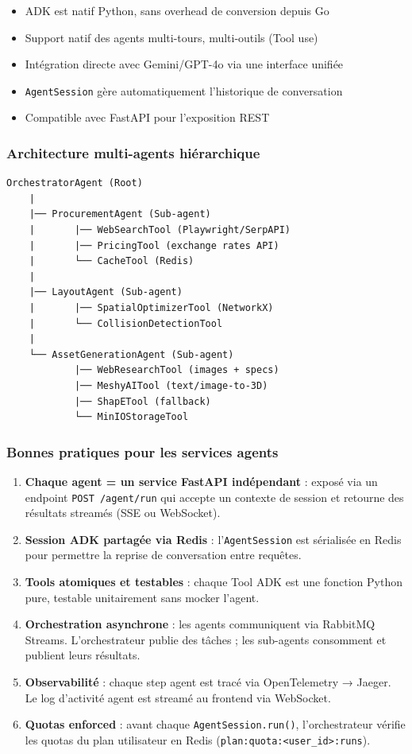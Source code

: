 \documentclass[12pt,a4paper]{article}
\begin{document}
\begin{itemize}
  \item ADK est natif Python, sans overhead de conversion depuis Go
  \item Support natif des agents multi-tours, multi-outils (Tool use)
  \item Intégration directe avec Gemini/GPT-4o via une interface unifiée
  \item \texttt{AgentSession} gère automatiquement l'historique de conversation
  \item Compatible avec FastAPI pour l'exposition REST
\end{itemize}

\subsubsection{Architecture multi-agents hiérarchique}

\begin{lstlisting}[language={}]
OrchestratorAgent (Root)
    |
    |── ProcurementAgent (Sub-agent)
    |       |── WebSearchTool (Playwright/SerpAPI)
    |       |── PricingTool (exchange rates API)
    |       └── CacheTool (Redis)
    |
    |── LayoutAgent (Sub-agent)
    |       |── SpatialOptimizerTool (NetworkX)
    |       └── CollisionDetectionTool
    |
    └── AssetGenerationAgent (Sub-agent)
            |── WebResearchTool (images + specs)
            |── MeshyAITool (text/image-to-3D)
            |── ShapETool (fallback)
            └── MinIOStorageTool
\end{lstlisting}

\subsubsection{Bonnes pratiques pour les services agents}

\begin{enumerate}
  \item \textbf{Chaque agent = un service FastAPI indépendant} : exposé via un endpoint \texttt{POST /agent/run} qui accepte un contexte de session et retourne des résultats streamés (SSE ou WebSocket).
  \item \textbf{Session ADK partagée via Redis} : l'\texttt{AgentSession} est sérialisée en Redis pour permettre la reprise de conversation entre requêtes.
  \item \textbf{Tools atomiques et testables} : chaque Tool ADK est une fonction Python pure, testable unitairement sans mocker l'agent.
  \item \textbf{Orchestration asynchrone} : les agents communiquent via RabbitMQ Streams. L'orchestrateur publie des tâches ; les sub-agents consomment et publient leurs résultats.
  \item \textbf{Observabilité} : chaque step agent est tracé via OpenTelemetry → Jaeger. Le log d'activité agent est streamé au frontend via WebSocket.
  \item \textbf{Quotas enforced} : avant chaque \texttt{AgentSession.run()}, l'orchestrateur vérifie les quotas du plan utilisateur en Redis (\texttt{plan:quota:<user\_id>:runs}).
\end{enumerate}
\end{document}
